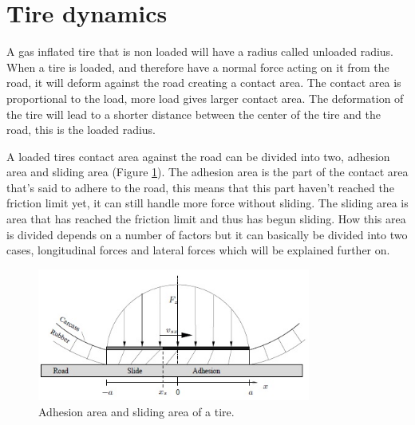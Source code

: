 \section{Tire dynamics}
A gas inflated tire that is non loaded will have a radius called unloaded radius. When a tire is loaded, and therefore have a normal force acting on it from the road, it will deform against the road creating a contact area. The contact area is proportional to the load, more load gives larger contact area. The deformation of the tire will lead to a shorter distance between the center of the tire and the road, this is the loaded radius. 

A loaded tires contact area against the road can be divided into two, adhesion area and sliding area (Figure \ref{adh_sliding}). The adhesion area is the part of the contact area that's said to adhere to the road, this means that this part haven't reached the friction limit yet, it can still handle more force without sliding. The sliding area is area that has reached the friction limit and thus has begun sliding. How this area is divided depends on a number of factors but it can basically be divided into two cases, longitudinal forces and lateral forces which will be explained further on.
\begin{figure}[h]
	\centering
	\includegraphics[width=0.8\textwidth]{Pictures/adh_sliding}
	\caption{Adhesion area and sliding area of a tire. \cite{svendenius2013}}
	\label{adh_sliding}
\end{figure}

